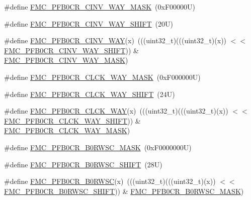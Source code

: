 \begin{DoxyCompactItemize}
\item 
\#define \mbox{\hyperlink{group___f_m_c___register___masks_gad64b080bc4174e9af7d04246befca017}{F\+M\+C\+\_\+\+P\+F\+B0\+C\+R\+\_\+\+C\+I\+N\+V\+\_\+\+W\+A\+Y\+\_\+\+M\+A\+SK}}~(0x\+F00000\+U)
\item 
\#define \mbox{\hyperlink{group___f_m_c___register___masks_ga987dfe8d13ee805246f048943fcb9ee5}{F\+M\+C\+\_\+\+P\+F\+B0\+C\+R\+\_\+\+C\+I\+N\+V\+\_\+\+W\+A\+Y\+\_\+\+S\+H\+I\+FT}}~(20\+U)
\item 
\#define \mbox{\hyperlink{group___f_m_c___register___masks_ga7479958e36ef48e44a9342dde2f075df}{F\+M\+C\+\_\+\+P\+F\+B0\+C\+R\+\_\+\+C\+I\+N\+V\+\_\+\+W\+AY}}(x)~(((uint32\+\_\+t)(((uint32\+\_\+t)(x)) $<$$<$ \mbox{\hyperlink{group___f_m_c___register___masks_ga987dfe8d13ee805246f048943fcb9ee5}{F\+M\+C\+\_\+\+P\+F\+B0\+C\+R\+\_\+\+C\+I\+N\+V\+\_\+\+W\+A\+Y\+\_\+\+S\+H\+I\+FT}})) \& \mbox{\hyperlink{group___f_m_c___register___masks_gad64b080bc4174e9af7d04246befca017}{F\+M\+C\+\_\+\+P\+F\+B0\+C\+R\+\_\+\+C\+I\+N\+V\+\_\+\+W\+A\+Y\+\_\+\+M\+A\+SK}})
\item 
\#define \mbox{\hyperlink{group___f_m_c___register___masks_ga84cd7c7d92e93b07f7c0f8d7cf003b98}{F\+M\+C\+\_\+\+P\+F\+B0\+C\+R\+\_\+\+C\+L\+C\+K\+\_\+\+W\+A\+Y\+\_\+\+M\+A\+SK}}~(0x\+F000000\+U)
\item 
\#define \mbox{\hyperlink{group___f_m_c___register___masks_ga3629d923b58bcbe6202254d72c69fab9}{F\+M\+C\+\_\+\+P\+F\+B0\+C\+R\+\_\+\+C\+L\+C\+K\+\_\+\+W\+A\+Y\+\_\+\+S\+H\+I\+FT}}~(24\+U)
\item 
\#define \mbox{\hyperlink{group___f_m_c___register___masks_ga891aff14fe52073658bd2479dffb4681}{F\+M\+C\+\_\+\+P\+F\+B0\+C\+R\+\_\+\+C\+L\+C\+K\+\_\+\+W\+AY}}(x)~(((uint32\+\_\+t)(((uint32\+\_\+t)(x)) $<$$<$ \mbox{\hyperlink{group___f_m_c___register___masks_ga3629d923b58bcbe6202254d72c69fab9}{F\+M\+C\+\_\+\+P\+F\+B0\+C\+R\+\_\+\+C\+L\+C\+K\+\_\+\+W\+A\+Y\+\_\+\+S\+H\+I\+FT}})) \& \mbox{\hyperlink{group___f_m_c___register___masks_ga84cd7c7d92e93b07f7c0f8d7cf003b98}{F\+M\+C\+\_\+\+P\+F\+B0\+C\+R\+\_\+\+C\+L\+C\+K\+\_\+\+W\+A\+Y\+\_\+\+M\+A\+SK}})
\item 
\#define \mbox{\hyperlink{group___f_m_c___register___masks_ga6231856131c9747d8bf0b2bebcf4f172}{F\+M\+C\+\_\+\+P\+F\+B0\+C\+R\+\_\+\+B0\+R\+W\+S\+C\+\_\+\+M\+A\+SK}}~(0x\+F0000000\+U)
\item 
\#define \mbox{\hyperlink{group___f_m_c___register___masks_gafc34ff86025a1657d05d3f6a2de1ec7f}{F\+M\+C\+\_\+\+P\+F\+B0\+C\+R\+\_\+\+B0\+R\+W\+S\+C\+\_\+\+S\+H\+I\+FT}}~(28\+U)
\item 
\#define \mbox{\hyperlink{group___f_m_c___register___masks_ga0741c38adeb4e926ab47b65f71ab369d}{F\+M\+C\+\_\+\+P\+F\+B0\+C\+R\+\_\+\+B0\+R\+W\+SC}}(x)~(((uint32\+\_\+t)(((uint32\+\_\+t)(x)) $<$$<$ \mbox{\hyperlink{group___f_m_c___register___masks_gafc34ff86025a1657d05d3f6a2de1ec7f}{F\+M\+C\+\_\+\+P\+F\+B0\+C\+R\+\_\+\+B0\+R\+W\+S\+C\+\_\+\+S\+H\+I\+FT}})) \& \mbox{\hyperlink{group___f_m_c___register___masks_ga6231856131c9747d8bf0b2bebcf4f172}{F\+M\+C\+\_\+\+P\+F\+B0\+C\+R\+\_\+\+B0\+R\+W\+S\+C\+\_\+\+M\+A\+SK}})
\end{DoxyCompactItemize}
